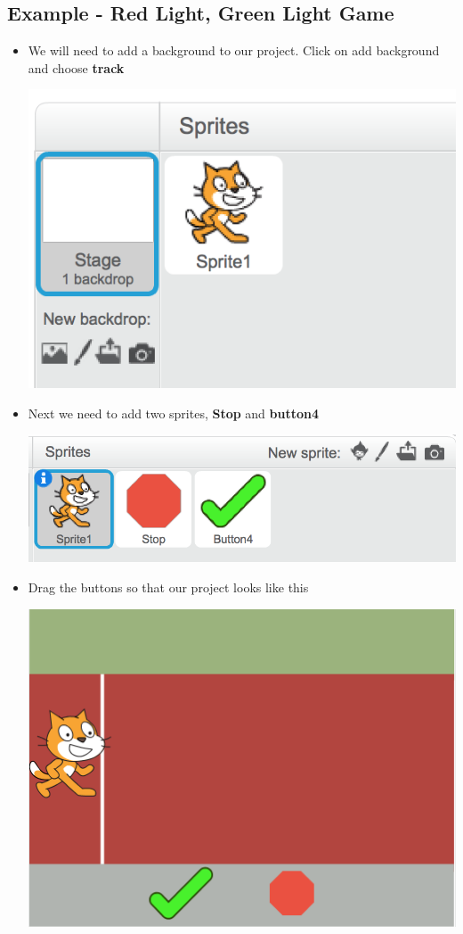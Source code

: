 \documentclass[12pt]{article}
\begin{document}
\subsection*{Example - Red Light, Green Light Game}
	\begin{itemize}
		\item We will need to add a background to our project. Click on add background and choose \textbf{track}
		\begin{center}
			\includegraphics[scale=.50]{./Images/image1}
		\end{center}
		\item Next we need to add two sprites, \textbf{Stop} and \textbf{button4}
		\begin{center}
			\includegraphics[scale=.50]{./Images/image2}
		\end{center}
		\item Drag the buttons so that our project looks like this
		\begin{center}
			\includegraphics[scale=.50]{./Images/image3}

\end{center}
\end{itemize}
\end{document}
